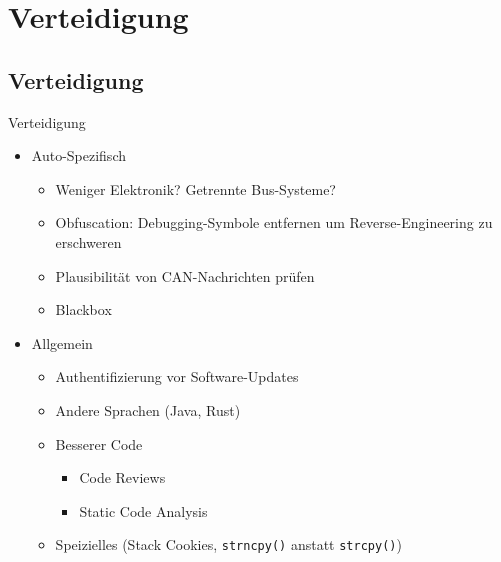 \section{Verteidigung}

\subsection{Verteidigung}

\begin{frame}[fragile]{Verteidigung}
    \begin{itemize}[<+->]
        \item Auto-Spezifisch
        \begin{itemize}
            \item Weniger Elektronik? Getrennte Bus-Systeme?
            \item Obfuscation: Debugging-Symbole entfernen um Reverse-Engineering
                  zu erschweren
            \item Plausibilität von CAN-Nachrichten prüfen
            \item Blackbox
        \end{itemize}
        \item Allgemein
        \begin{itemize}
            \item Authentifizierung vor Software-Updates
            \item Andere Sprachen (Java, Rust)
            \item Besserer Code
            \begin{itemize}
                \item Code Reviews
                \item Static Code Analysis
            \end{itemize}
            \item Speizielles (Stack Cookies, \verb+strncpy()+ anstatt \verb+strcpy()+)
        \end{itemize}
    \end{itemize}
\end{frame}